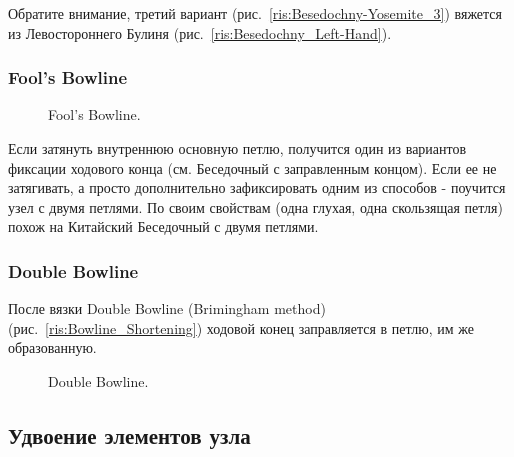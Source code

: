 Обратите внимание, третий вариант (рис.~\ref{ris:Besedochny-Yosemite_3}) вяжется из Левостороннего Булиня (рис.~\ref{ris:Besedochny_Left-Hand}).


\subsubsection*{Fool's Bowline}

\begin{figure}[H]\centering
	\begin{minipage}{1\linewidth}
		\begin{center}
			\tcbox[enhanced jigsaw,colframe=black,opacityframe=0.5,opacityback=0.5]
			{\centering{}}
		\end{center}
	\end{minipage}
\caption{Fool's Bowline.}
\label{ris:Fools_Bowline}
\end{figure}

Если затянуть внутреннюю основную петлю, получится один из вариантов фиксации ходового конца (см. Беседочный с заправленным концом). Если ее не затягивать, а просто дополнительно зафиксировать одним из способов - поучится узел с двумя петлями. По своим свойствам (одна глухая, одна скользящая петля) похож на Китайский Беседочный с двумя петлями.

\subsubsection*{Double Bowline}


После вязки Double Bowline (Brimingham method) (рис.~\ref{ris:Bowline_Shortening}) ходовой конец заправляется в петлю, им же образованную.

\begin{figure}[H]\centering
	\begin{minipage}{1\linewidth}
		\begin{center}
			\tcbox[enhanced jigsaw,colframe=black,opacityframe=0.5,opacityback=0.5]
			{\centering{}}
		\end{center}
	\end{minipage}
\caption{Double Bowline.}
\label{ris:Double_Bowline_}
\end{figure}

\subsection*{Удвоение элементов узла}


